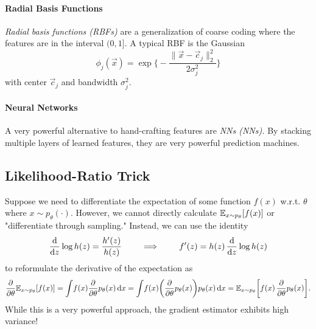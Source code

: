 			\paragraph{Radial Basis Functions}
				\emph{Radial basis functions (\acsp{RBF})} are a generalization of coarse coding where the features are in the interval \((0, 1]\). A typical \ac{RBF} is the Gaussian
				\begin{equation}
					\phi_j(\vec{x}) = \exp\Biggl\{ -\frac{\lVert \vec{x} - \vec{c}_j \rVert_2^2}{2 \sigma_j^2} \Biggr\}
				\end{equation}
				with center \(\vec{c}_j\) and bandwidth \( \sigma_j^2 \).

			\paragraph{Neural Networks}
				A very powerful alternative to hand-crafting features are \emph{\aclp{NN} (\acsp{NN}).} By stacking multiple layers of learned features, they are very powerful prediction machines.

		\subsection{Likelihood-Ratio Trick}
			\label{subsec:likelihoodRatio}

			Suppose we need to differentiate the expectation of some function \( f(x) \) w.r.t. \(\theta\) where \( x \sim p_\theta(\cdot) \). However, we cannot directly calculate \( \mathbb{E}_{x \sim p_\theta}[f(x)] \) or "differentiate through sampling." Instead, we can use the identity
			\begin{equation}
				\dv{z} \log h(z) = \frac{h'(z)}{h(z)}
				\qquad\implies\qquad
				f'(z) = h(z) \, \dv{z} \log h(z)
			\end{equation}
			to reformulate the derivative of the expectation as
			\begin{equation}
				\pdv{\theta} \mathbb{E}_{x \sim p_\theta}[f(x)]
					= \int\! f(x) \pdv{\theta} p_\theta(x) \dd{x}
					= \int\! f(x) \biggl( \pdv{\theta} p_\theta(x) \biggr) p_\theta(x) \dd{x}
					= \mathbb{E}_{x \sim p_\theta} \biggl[ f(x) \, \pdv{\theta} p_\theta(x) \biggr].
			\end{equation}
			While this is a very powerful approach, the gradient estimator exhibits high variance!


